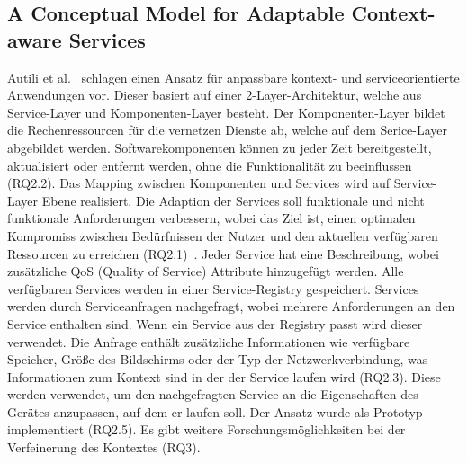 \documentclass[conference,compsoc,ngerman]{IEEEtran}
\begin{document}
\subsection{A Conceptual Model for Adaptable Context-aware Services}
Autili et al.~\cite{autili2006conceptual} schlagen einen Ansatz für anpassbare kontext- und serviceorientierte Anwendungen vor. Dieser basiert auf einer 2-Layer-Architektur, welche aus Service-Layer und Komponenten-Layer besteht. Der Komponenten-Layer bildet die Rechenressourcen für die vernetzen Dienste ab, welche auf dem Serice-Layer abgebildet werden. Softwarekomponenten können zu jeder Zeit bereitgestellt, aktualisiert oder entfernt werden, ohne die Funktionalität zu beeinflussen (RQ2.2). Das Mapping zwischen Komponenten und Services wird auf Service-Layer Ebene realisiert.
Die Adaption der Services soll funktionale und nicht funktionale Anforderungen verbessern, wobei das Ziel ist, einen optimalen Kompromiss zwischen Bedürfnissen der Nutzer und den aktuellen verfügbaren Ressourcen zu erreichen (RQ2.1)~\cite{autili2006conceptual}. Jeder Service hat eine Beschreibung, wobei zusätzliche QoS (Quality of Service) Attribute hinzugefügt werden. Alle verfügbaren Services werden in einer Service-Registry gespeichert. Services werden durch Serviceanfragen nachgefragt, wobei mehrere Anforderungen an den Service enthalten sind. Wenn ein Service aus der Registry passt wird dieser verwendet. Die Anfrage enthält zusätzliche Informationen wie verfügbare Speicher, Größe des Bildschirms oder der Typ der Netzwerkverbindung, was Informationen zum Kontext sind in der der Service laufen wird (RQ2.3). Diese werden verwendet, um den nachgefragten Service an die Eigenschaften des Gerätes anzupassen, auf dem er laufen soll.
Der Ansatz wurde als Prototyp implementiert (RQ2.5). Es gibt weitere Forschungsmöglichkeiten bei der Verfeinerung des Kontextes (RQ3).
\end{document}
